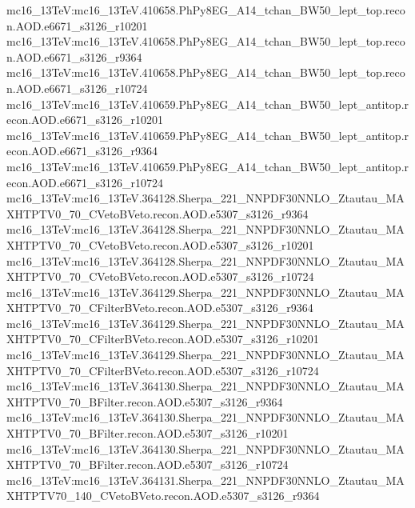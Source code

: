{ mc16\_13TeV:mc16\_13TeV.410658.PhPy8EG\_A14\_tchan\_BW50\_lept\_top.recon.AOD.e6671\_s3126\_r10201   \newline 
 mc16\_13TeV:mc16\_13TeV.410658.PhPy8EG\_A14\_tchan\_BW50\_lept\_top.recon.AOD.e6671\_s3126\_r9364   \newline
 mc16\_13TeV:mc16\_13TeV.410658.PhPy8EG\_A14\_tchan\_BW50\_lept\_top.recon.AOD.e6671\_s3126\_r10724   \newline 
 mc16\_13TeV:mc16\_13TeV.410659.PhPy8EG\_A14\_tchan\_BW50\_lept\_antitop.recon.AOD.e6671\_s3126\_r10201   \newline 
 mc16\_13TeV:mc16\_13TeV.410659.PhPy8EG\_A14\_tchan\_BW50\_lept\_antitop.recon.AOD.e6671\_s3126\_r9364   \newline 
 mc16\_13TeV:mc16\_13TeV.410659.PhPy8EG\_A14\_tchan\_BW50\_lept\_antitop.recon.AOD.e6671\_s3126\_r10724   \newline 
 mc16\_13TeV:mc16\_13TeV.364128.Sherpa\_221\_NNPDF30NNLO\_Ztautau\_MAXHTPTV0\_70\_CVetoBVeto.recon.AOD.e5307\_s3126\_r9364\newline    
 mc16\_13TeV:mc16\_13TeV.364128.Sherpa\_221\_NNPDF30NNLO\_Ztautau\_MAXHTPTV0\_70\_CVetoBVeto.recon.AOD.e5307\_s3126\_r10201 \newline   
 mc16\_13TeV:mc16\_13TeV.364128.Sherpa\_221\_NNPDF30NNLO\_Ztautau\_MAXHTPTV0\_70\_CVetoBVeto.recon.AOD.e5307\_s3126\_r10724   \newline 
 mc16\_13TeV:mc16\_13TeV.364129.Sherpa\_221\_NNPDF30NNLO\_Ztautau\_MAXHTPTV0\_70\_CFilterBVeto.recon.AOD.e5307\_s3126\_r9364   \newline 
 mc16\_13TeV:mc16\_13TeV.364129.Sherpa\_221\_NNPDF30NNLO\_Ztautau\_MAXHTPTV0\_70\_CFilterBVeto.recon.AOD.e5307\_s3126\_r10201   \newline 
 mc16\_13TeV:mc16\_13TeV.364129.Sherpa\_221\_NNPDF30NNLO\_Ztautau\_MAXHTPTV0\_70\_CFilterBVeto.recon.AOD.e5307\_s3126\_r10724 \newline   
 mc16\_13TeV:mc16\_13TeV.364130.Sherpa\_221\_NNPDF30NNLO\_Ztautau\_MAXHTPTV0\_70\_BFilter.recon.AOD.e5307\_s3126\_r9364 \newline   
 mc16\_13TeV:mc16\_13TeV.364130.Sherpa\_221\_NNPDF30NNLO\_Ztautau\_MAXHTPTV0\_70\_BFilter.recon.AOD.e5307\_s3126\_r10201   \newline 
 mc16\_13TeV:mc16\_13TeV.364130.Sherpa\_221\_NNPDF30NNLO\_Ztautau\_MAXHTPTV0\_70\_BFilter.recon.AOD.e5307\_s3126\_r10724   
 mc16\_13TeV:mc16\_13TeV.364131.Sherpa\_221\_NNPDF30NNLO\_Ztautau\_MAXHTPTV70\_140\_CVetoBVeto.recon.AOD.e5307\_s3126\_r9364   \newline 
}
